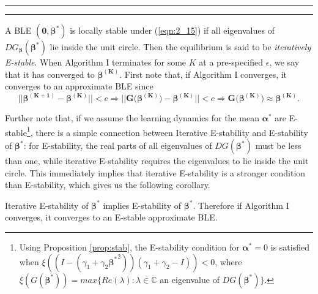 \begin{table}[!htbp]
\hrule
\hrule

\label{algo1}
\end{table}

 A BLE $(\pmb{0}, \pmb{\beta^{*}})$ is locally stable under (\ref{eqn:2_15}) if all eigenvalues of $DG_{\pmb{\beta}}(\pmb{\beta^{*}})$ lie inside the unit circle. Then the equilibrium is said to be \textit{iteratively E-stable}. When Algorithm I terminates for some $K$ at a pre-specified $\epsilon$, we say that it has converged to $\pmb{\beta^{(K)}}$. First note that, if Algorithm I converges, it converges to an approximate BLE since 
$$ ||\pmb{ \beta^{(K+1)}} -\pmb{ \beta^{(K)}}|| < c \Rightarrow ||\pmb{ G(\beta^{(K)}}) -\pmb{ \beta^{(K)}}|| < c \Rightarrow \pmb{ G(\beta^{(K)}}) \approx \pmb{ \beta^{(K)}}. $$

\noindent
Further note that, if we assume the learning dynamics for the mean $\pmb{\alpha^{*}}$ are E-stable\footnote{Using Proposition \ref{prop:stab}, the E-stability condition for $\pmb{\alpha^{*}}=0$ is satisfied when $\xi((I-(\gamma_1+\gamma_2 \pmb{{\beta^{*}}}^2))(\gamma_1+\gamma_2-I))<0$, where $\xi(G(\pmb{\beta^{*}}))=max \{ Re(\lambda): \lambda \in \mathbb{C}$ an eigenvalue of $DG(\pmb{\beta^{*}}) \}$.}, there is a simple connection between Iterative E-stability and E-stability of $\pmb{\beta^{*}}$: for E-stability, the real parts of all eigenvalues of $DG(\pmb{ \beta^{*}})$ must be less than one, while iterative E-stability requires the eigenvalues to lie inside the unit circle. This immediately implies that iterative E-stability is a stronger condition than E-stability, which gives us the following corollary. 

\begin{cor}
Iterative E-stability of $\pmb{\beta^{*}}$ implies E-stability of $\pmb{\beta^{*}}$. Therefore if Algorithm I converges, it converges to an E-stable approximate BLE.
\end{cor}

